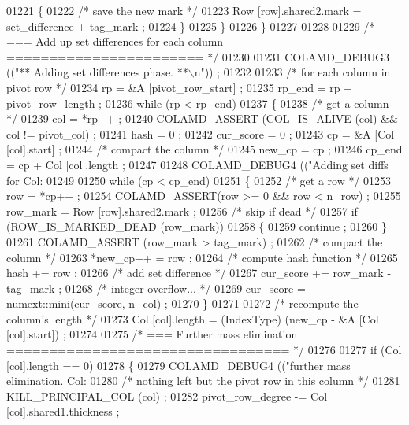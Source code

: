 \begin{DoxyCode}
{{{{{{{{{{{{{{{{{{{{{{{{01221     \{
01222       \textcolor{comment}{/* save the new mark */}
01223       Row [row].shared2.mark = set\_difference + tag\_mark ;
01224     \}
01225       \}
01226     \}
01227 
01228 
01229     \textcolor{comment}{/* === Add up set differences for each column ======================= */}
01230 
01231     COLAMD\_DEBUG3 ((\textcolor{stringliteral}{"** Adding set differences phase. **\(\backslash\)n"})) ;
01232 
01233     \textcolor{comment}{/* for each column in pivot row */}
01234     rp = &A [pivot\_row\_start] ;
01235     rp\_end = rp + pivot\_row\_length ;
01236     \textcolor{keywordflow}{while} (rp < rp\_end)
01237     \{
01238       \textcolor{comment}{/* get a column */}
01239       col = *rp++ ;
01240       COLAMD\_ASSERT (COL\_IS\_ALIVE (col) && col != pivot\_col) ;
01241       hash = 0 ;
01242       cur\_score = 0 ;
01243       cp = &A [Col [col].start] ;
01244       \textcolor{comment}{/* compact the column */}
01245       new\_cp = cp ;
01246       cp\_end = cp + Col [col].length ;
01247 
01248       COLAMD\_DEBUG4 ((\textcolor{stringliteral}{"Adding set diffs for Col: %
01249 
01250       \textcolor{keywordflow}{while} (cp < cp\_end)
01251       \{
01252     \textcolor{comment}{/* get a row */}
01253     row = *cp++ ;
01254     COLAMD\_ASSERT(row >= 0 && row < n\_row) ;
01255     row\_mark = Row [row].shared2.mark ;
01256     \textcolor{comment}{/* skip if dead */}
01257     \textcolor{keywordflow}{if} (ROW\_IS\_MARKED\_DEAD (row\_mark))
01258     \{
01259       continue ;
01260     \}
01261     COLAMD\_ASSERT (row\_mark > tag\_mark) ;
01262     \textcolor{comment}{/* compact the column */}
01263     *new\_cp++ = row ;
01264     \textcolor{comment}{/* compute hash function */}
01265     hash += row ;
01266     \textcolor{comment}{/* add set difference */}
01267     cur\_score += row\_mark - tag\_mark ;
01268     \textcolor{comment}{/* integer overflow... */}
01269     cur\_score = numext::mini(cur\_score, n\_col) ;
01270       \}
01271 
01272       \textcolor{comment}{/* recompute the column's length */}
01273       Col [col].length = (IndexType) (new\_cp - &A [Col [col].start]) ;
01274 
01275       \textcolor{comment}{/* === Further mass elimination ================================= */}
01276 
01277       \textcolor{keywordflow}{if} (Col [col].length == 0)
01278       \{
01279     COLAMD\_DEBUG4 ((\textcolor{stringliteral}{"further mass elimination. Col: %
01280     \textcolor{comment}{/* nothing left but the pivot row in this column */}
01281     KILL\_PRINCIPAL\_COL (col) ;
01282     pivot\_row\_degree -= Col [col].shared1.thickness ;
}}}}}}}}}}}}}}}}}}}}}}}}}}
\end{DoxyCode}
